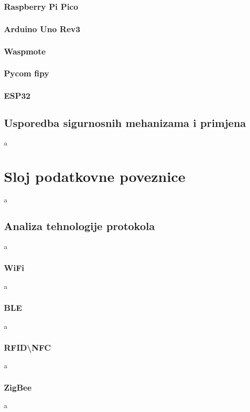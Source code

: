 \documentclass[times, utf8, diplomski]{fer}
\begin{document}
\subsubsection{Raspberry Pi Pico}
\subsubsection{Arduino Uno Rev3 }
\subsubsection{Waspmote}
\subsubsection{Pycom fipy}
\subsubsection{ESP32}

\subsection{Usporedba sigurnosnih mehanizama i primjena}
a

\section{Sloj podatkovne poveznice}
a

\subsection{Analiza tehnologije protokola}%
a

\subsubsection{WiFi}
a

\subsubsection{BLE}
a

\subsubsection{RFID\textbackslash NFC}
a

\subsubsection{ZigBee}
a
\end{document}
